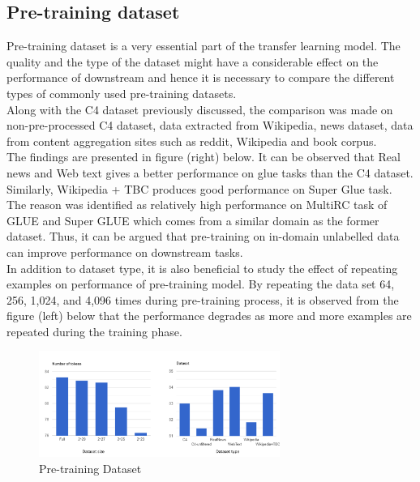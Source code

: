 \subsection{Pre-training dataset}
Pre-training dataset is a very essential part of the transfer learning model. The quality and the type of the dataset might have a considerable effect on the performance of downstream and hence it is necessary to compare the different types of commonly used pre-training datasets. \\
Along with the C4 dataset previously discussed, the comparison was made on non-pre-processed C4 dataset, data extracted from Wikipedia, news dataset, data from content aggregation sites such as reddit, Wikipedia and book corpus. \\
The findings are presented in figure (right) below. It can be observed that Real news and Web text gives a better performance on glue tasks than the C4 dataset. Similarly, Wikipedia + TBC produces good performance on Super Glue task. The reason was identified as relatively high performance on MultiRC task of GLUE and Super GLUE which comes from a similar domain as the former dataset.  Thus, it can be argued that pre-training on in-domain unlabelled data can improve performance on downstream tasks. \\
In addition to dataset type, it is also beneficial to study the effect of repeating examples on performance of pre-training model. By repeating the data set 64, 256, 1,024, and 4,096 times during pre-training process, it is observed from the figure (left) below that the performance degrades as more and more examples are repeated during the training phase. 

\begin{figure}[H]
\centering
\includegraphics[width=0.7\textwidth]{images/predataset.png}
\caption{Pre-training Dataset}
\label{fig:predataset}
\end{figure}

